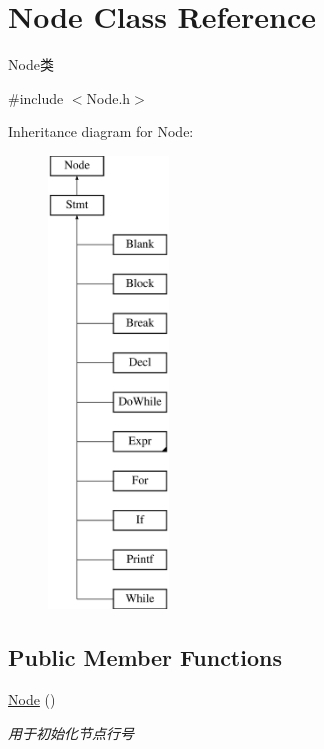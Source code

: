 \hypertarget{class_node}{}\section{Node Class Reference}
\label{class_node}


Node类  




{\ttfamily \#include $<$Node.\+h$>$}

Inheritance diagram for Node\+:\begin{figure}[H]
\begin{center}
\leavevmode
\includegraphics[height=12.000000cm]{class_node}
\end{center}
\end{figure}
\subsection*{Public Member Functions}
\begin{DoxyCompactItemize}
\item 
\mbox{\label{class_node_ad7a34779cad45d997bfd6d3d8043c75f}} 
\hyperlink{class_node_ad7a34779cad45d997bfd6d3d8043c75f}{Node} ()
\begin{DoxyCompactList}\small\item\em 用于初始化节点行号 \end{DoxyCompactList}\end{DoxyCompactItemize}
